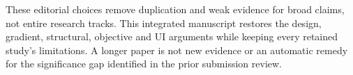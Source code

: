 These editorial choices remove duplication and weak evidence for broad claims,
not entire research tracks. This integrated manuscript restores the design,
gradient, structural, objective and UI arguments while keeping every retained
study's limitations. A longer paper is not new evidence or an automatic remedy
for the significance gap identified in the prior submission review.
